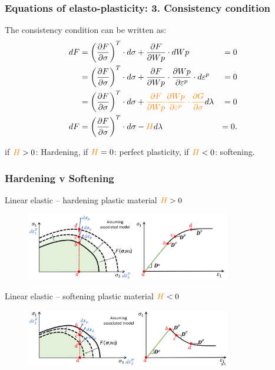 \documentclass[notes]{beamer}
\begin{document}
\begin{frame}
\frametitle{Equations of elasto-plasticity: 3. Consistency condition}
The consistency condition can be written as:
	\begin{align*}
	dF & = \left(\frac{\partial F}{\partial \sigma}\right)^T \cdot d \sigma + \frac{\partial F}{\partial Wp}\cdot dWp & = 0 \\
	 & = \left(\frac{\partial F}{\partial \sigma}\right)^T \cdot d \sigma + \frac{\partial F}{\partial Wp}\cdot \frac{\partial Wp}{\partial \varepsilon^p}\cdot d \varepsilon^p & = 0 \\
	 & = \left(\frac{\partial F}{\partial \sigma}\right)^T \cdot d \sigma + \textcolor{orange}{\frac{\partial F}{\partial Wp}\frac{\partial Wp}{\partial \varepsilon^p}\cdot\frac{\partial G}{\partial 	\sigma}} d\lambda  & = 0 \\
	dF & = \left(\frac{\partial F}{\partial \sigma}\right)^T \cdot d \sigma - \textcolor{orange}{H} d\lambda & = 0.
	\end{align*}

	if $\textcolor{orange}{H} > 0$: Hardening, if $\textcolor{orange}{H} = 0$: perfect plasticity, if $\textcolor{orange}{H} < 0$: softening.
\end{frame}


\begin{frame}
\frametitle{Hardening v Softening}
Linear elastic – hardening plastic material  $\textcolor{orange}{H} > 0$
\begin{figure}
	\includegraphics[width=0.8\textwidth]{figs/hardening-plastic.png}
\end{figure}
Linear elastic – softening plastic material  $\textcolor{orange}{H} < 0$
\begin{figure}
	\includegraphics[width=0.8\textwidth]{figs/softening-plastic.png}
\end{figure}
\end{frame}
\end{document}

